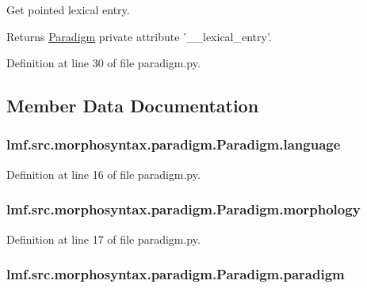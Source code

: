 Get pointed lexical entry. 

\begin{DoxyReturn}{Returns}
\hyperlink{classlmf_1_1src_1_1morphosyntax_1_1paradigm_1_1_paradigm}{Paradigm} private attribute '\+\_\+\+\_\+lexical\+\_\+entry'. 
\end{DoxyReturn}


Definition at line 30 of file paradigm.\+py.



\subsection{Member Data Documentation}
\hypertarget{classlmf_1_1src_1_1morphosyntax_1_1paradigm_1_1_paradigm_a536c9155740d0363044389ce31dff090}{
\subsubsection[{language}]{\setlength{\rightskip}{0pt plus 5cm}lmf.\+src.\+morphosyntax.\+paradigm.\+Paradigm.\+language}}\label{classlmf_1_1src_1_1morphosyntax_1_1paradigm_1_1_paradigm_a536c9155740d0363044389ce31dff090}


Definition at line 16 of file paradigm.\+py.

\hypertarget{classlmf_1_1src_1_1morphosyntax_1_1paradigm_1_1_paradigm_a7c9c944b764a0351f0e58234b48bdf86}{
\subsubsection[{morphology}]{\setlength{\rightskip}{0pt plus 5cm}lmf.\+src.\+morphosyntax.\+paradigm.\+Paradigm.\+morphology}}\label{classlmf_1_1src_1_1morphosyntax_1_1paradigm_1_1_paradigm_a7c9c944b764a0351f0e58234b48bdf86}


Definition at line 17 of file paradigm.\+py.

\hypertarget{classlmf_1_1src_1_1morphosyntax_1_1paradigm_1_1_paradigm_a2c706c0653324f536c9fc8b20d5dbf15}{
\subsubsection[{paradigm}]{\setlength{\rightskip}{0pt plus 5cm}lmf.\+src.\+morphosyntax.\+paradigm.\+Paradigm.\+paradigm}}\label{classlmf_1_1src_1_1morphosyntax_1_1paradigm_1_1_paradigm_a2c706c0653324f536c9fc8b20d5dbf15}


